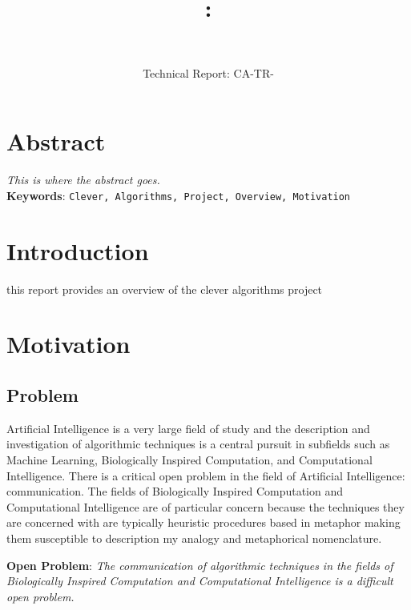 \documentclass[a4paper, 11pt]{article}
\title{{\myreporttitle}: {\myreportsubtitle}\\{\normalsize\myreportproject}}
\author{\myreportname\\\myreportemail}
\date{Technical Report: CA-TR-\myreportdate}
\begin{document}
\maketitle

\section*{Abstract} 
\label{sec:abstract}
\emph{This is where the abstract goes.}
\\
\textbf{Keywords}: \texttt{Clever, Algorithms, Project, Overview, Motivation}

\section{Introduction}
\label{sec:introduction}

this report provides an overview of the clever algorithms project

\section{Motivation}

\subsection{Problem}
Artificial Intelligence is a very large field of study and the description and investigation of algorithmic techniques is a central pursuit in subfields such as Machine Learning, Biologically Inspired Computation, and Computational Intelligence. There is a critical open problem in the field of Artificial Intelligence: communication. The fields of Biologically Inspired Computation and Computational Intelligence are of particular concern because the techniques they are concerned with are typically heuristic procedures based in metaphor making them susceptible to description my analogy and metaphorical nomenclature.

\textbf{Open Problem}: \emph{The communication of algorithmic techniques in the fields of Biologically Inspired Computation and Computational Intelligence is a difficult open problem.}
\end{document}
